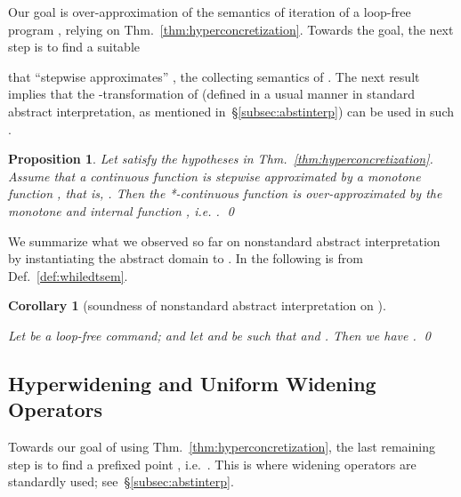 \documentclass[envcountsect,orivec]{llncs} \pdfoutput=1
\newtheorem{mycor}[mythm]{Corollary}
\newtheorem{myprop}[mythm]{Proposition}
\theoremstyle{definition}
\def\myqed{\qed}
\begin{document}
       






Our goal is
over-approximation of 
the semantics of iteration of a loop-free  program , 
relying on  Thm.~\ref{thm:hyperconcretization}.
Towards the goal, the next step
 is to find a suitable

that ``stepwise approximates'' , the collecting semantics of .
  The next result implies that the -transformation of 
 (defined in a usual manner in standard abstract interpretation, as mentioned in~\S{}\ref{subsec:abstinterp}) can be used in
 such .




 \begin{myprop}
Let
 satisfy the hypotheses in Thm.~\ref{thm:hyperconcretization}.
 Assume that a continuous function  is stepwise approximated by a monotone function
  , that is, 
.
 Then  the *-continuous function  is over-approximated by the monotone and internal function , i.e. .
 \myqed
 \end{myprop}
















We summarize what we observed so far on nonstandard abstract
interpretation by instantiating the abstract domain to .
In the following  is from Def.~\ref{def:whiledtsem}.
\begin{mycor}[soundness of nonstandard abstract interpretation on ]
\label{cor:soundnessOfHyperAbstractDomains}



 Let  be a loop-free  command;
       and let 
       and  be such that  and
       .
        Then we have .
\myqed
\end{mycor}

\subsection{Hyperwidening and Uniform Widening Operators}
\label{subsec:uniformWidening}
Towards our goal of using Thm.~\ref{thm:hyperconcretization}, the last
remaining step is to find a prefixed point ,
i.e.\
 .
This is where widening operators are standardly used; see~\S{}\ref{subsec:abstinterp}.
\end{document}
